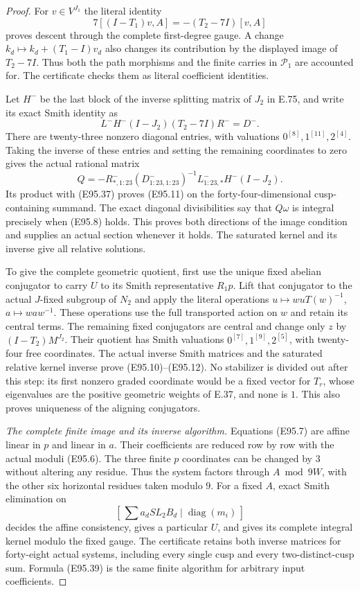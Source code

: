 \begin{proof}
For $v\in V^{J_1}$ the literal identity
\[
 7[(I-T_1)v,A]=-(T_2-7I)[v,A]
 \tag{E95.36}
\]
proves descent through the complete first-degree
gauge. A change $k_d\mapsto k_d+(T_1-I)v_d$
also changes its contribution by the displayed
image of $T_2-7I$. Thus both the path morphisms
and the finite carries in $\mathcal P_1$ are
accounted for. The certificate checks them as
literal coefficient identities.

Let $H^-$ be the last block of the inverse splitting
matrix of $J_2$ in E.75, and write its exact Smith
identity as
\[
 L^- H^-(I-J_2)(T_2-7I)R^-=D^-.
 \tag{E95.37}
\]
There are twenty-three nonzero diagonal entries,
with valuations $0^{[8]},1^{[11]},2^{[4]}$.
Taking the inverse of these entries and setting
the remaining coordinates to zero gives the actual
rational matrix
\[
 Q=-R^-_{*,1:23}(D^-_{1:23,1:23})^{-1}
                   L^-_{1:23,*}H^-(I-J_2).
 \tag{E95.38}
\]
Its product with (E95.37) proves (E95.11) on the
forty-four-dimensional cusp-containing summand.
The exact diagonal divisibilities say that $Q\omega$
is integral precisely when (E95.8) holds. This proves
both directions of the image condition and supplies
an actual section whenever it holds. The saturated
kernel and its inverse give all relative solutions.

To give the complete geometric quotient, first use
the unique fixed abelian conjugator to carry $U$
to its Smith representative $R_1p$. Lift that
conjugator to the actual $J$-fixed subgroup of
$N_2$ and apply the literal operations
$u\mapsto w uT(w)^{-1}$, $a\mapsto w a w^{-1}$.
These operations use the full transported action
on $w$ and retain its central terms. The remaining
fixed conjugators are central and change only $z$
by $(I-T_2)M^{J_2}$. Their quotient has Smith
valuations $0^{[7]},1^{[9]},2^{[5]}$, with twenty-four
free coordinates. The actual inverse Smith matrices
and the saturated relative kernel inverse prove
(E95.10)--(E95.12). No stabilizer is divided out
after this step: its first nonzero graded coordinate
would be a fixed vector for $T_r$, whose eigenvalues
are the positive geometric weights of E.37, and none
is $1$. This also proves uniqueness of the aligning
conjugators.

\emph{The complete finite image and its inverse algorithm.}
Equations (E95.7) are affine linear in $p$ and linear
in $a$. Their coefficients are reduced row by row
with the actual moduli (E95.6). The three finite
$p$ coordinates can be changed by $3$ without
altering any residue. Thus the system factors through
$A\bmod9W$, with the other six horizontal residues
taken modulo $9$. For a fixed $A$, exact Smith
elimination on
\[
 [\,\sum a_dSL_2B_d\mid\operatorname{diag}(m_i)\,]
 \tag{E95.39}
\]
decides the affine consistency, gives a particular
$U$, and gives its complete integral kernel modulo
the fixed gauge. The certificate retains both
inverse matrices for forty-eight actual systems,
including every single cusp and every two-distinct-cusp
sum. Formula (E95.39) is the same finite algorithm
for arbitrary input coefficients.


\end{proof}
